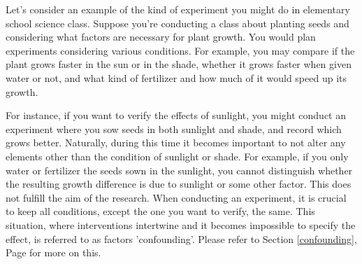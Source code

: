 \documentclass{ltjbook}
\begin{document}
Let's consider an example of the kind of experiment you might do in elementary school science class. Suppose you're conducting a class about planting seeds and considering what factors are necessary for plant growth. You would plan experiments considering various conditions. For example, you may compare if the plant grows faster in the sun or in the shade, whether it grows faster when given water or not, and what kind of fertilizer and how much of it would speed up its growth.

For instance, if you want to verify the effects of sunlight, you might conduct an experiment where you sow seeds in both sunlight and shade, and record which grows better. Naturally, during this time it becomes important to not alter any elements other than the condition of sunlight or shade. For example, if you only water or fertilizer the seeds sown in the sunlight, you cannot distinguish whether the resulting growth difference is due to sunlight or some other factor. This does not fulfill the aim of the research. When conducting an experiment, it is crucial to keep all conditions, except the one you want to verify, the same. This situation, where interventions intertwine and it becomes impossible to specify the effect, is referred to as factors 'confounding'. Please refer to Section \ref{confounding}, Page \pageref{confounding} for more on this.
\end{document}
